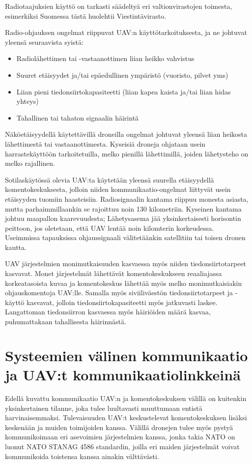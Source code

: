 Radiotaajuksien käyttö on tarkasti säädeltyä eri valtionvirastojen toimesta,
esimerkiksi Suomessa tästä huolehtii Viestintävirasto.

Radio-ohjauksen ongelmat riippuvat UAV:n käyttötarkoituksesta, ja ne johtuvat
yleensä seuraavista syistä:~\cite{Austin2010}
\begin{itemize}
  \item Radiolähettimen tai -vastaanottimen liian heikko vahvistus
  \item Suuret etäisyydet ja/tai epäedullinen ympäristö (vuoristo, pilvet yms)
  \item Liian pieni tiedonsiirtokapasiteetti (liian kapea kaista ja/tai liian
    hidas yhteys)
  \item Tahallinen tai tahaton signaalin häirintä
\end{itemize}

Näköetäisyydellä käytettävillä droneilla ongelmat johtuvat yleensä liian
heikosta lähettimestä tai vastaanottimesta. Kyseisiä droneja ohjataan usein
harrastekäyttöön tarkoitetuilla, melko pienillä lähettimillä, joiden
lähetysteho on melko rajallinen.~\cite{Austin2010}

Sotilaskäytössä olevia UAV:ta käytetään yleensä suurella etäisyydellä
komentokeskuksesta, jolloin niiden kommunikaatio-ongelmat liittyvät usein
etäisyyden tuomiin haasteisiin. Radiosignaalin kantama riippuu monesta asiasta,
mutta parhaimmillaankin se rajoittuu noin 130 kilometriin. Kyseinen kantama
johtuu maapallon kaarevuudesta; Lähetysasema jää yksinkertaisesti horisontin
peittoon, jos oletetaan, että UAV lentää noin kilomterin
korkeudessa.~\cite{Austin2010} Useimmissa tapauksissa ohjaussignaali
välitetäänkin satellitiin tai toisen dronen kautta.

UAV järjestelmien monimutkaisuuden kasvaessa myös niiden tiedonsiirtotarpeet
kasvavat. Monet järjestelmät lähettävät komentokeskukseen reaaliajassa
korkeatasoista kuvaa ja komentokeskus lähettää myös melko monimutkaisiakin
ohjauskomentoja UAV:lle. Samalla myös siviiliväestön tiedonsiirtotarpeet ja
-käyttö kasvavat, jolloin tiedonsiirtokapasiteetti myös jatkuvasti laskee.
Langattoman tiedonsiirron kasvaessa myös häiriöiden määrä kasvaa, puhumattakaan
tahallisesta häirinnästä.~\cite{Austin2010}

\section{Systeemien välinen kommunikaatio ja UAV:t kommunikaatiolinkkeinä}
Edellä kuvattu kommunikaatio UAV:n ja komentokeskuksen välillä on kuitenkin
yksinkertainen tilanne, joka tulee luultavasti muuttumaan entistä
harvinaisemmaksi. Tulevaisuuden UAV:t keskustelevat komentokeskuksen lisäksi
keskenään ja muiden toimijoiden kanssa. Välillä dronejen tulee myös pystyä
kommunikoimaan eri asevoimien järjestelmien kanssa, jonka takia NATO on luonut
NATO STANAG 4586 standardin, joilla eri maiden järjestelmät voivat kommunikoida
toistensa kanssa ainakin välttävästi.\cite{Austin2010}

